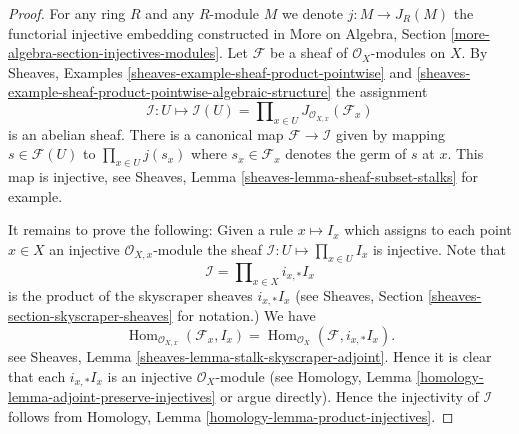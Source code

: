 \documentclass[10pt,a4paper]{amsart}
\theoremstyle{plain}
\theoremstyle{definition}
\theoremstyle{remark}
\numberwithin{equation}{subsection}
\def\Hom{\mathop{\mathrm{Hom}}\nolimits}
\begin{document}
\begin{proof}
For any ring $R$ and any $R$-module $M$ we denote
$j : M \to J_R(M)$ the functorial
injective embedding constructed in
More on Algebra, Section \ref{more-algebra-section-injectives-modules}.
Let $\mathcal{F}$ be a sheaf of $\mathcal{O}_X$-modules on $X$.
By Sheaves, Examples \ref{sheaves-example-sheaf-product-pointwise}
and \ref{sheaves-example-sheaf-product-pointwise-algebraic-structure}
the assignment
$$
\mathcal{I} : U \mapsto
\mathcal{I}(U) = \prod\nolimits_{x\in U} J_{\mathcal{O}_{X, x}}(\mathcal{F}_x)
$$
is an abelian sheaf.
There is a canonical map $\mathcal{F} \to \mathcal{I}$
given by mapping $s \in \mathcal{F}(U)$ to $\prod_{x \in U} j(s_x)$
where $s_x \in \mathcal{F}_x$ denotes the germ of $s$ at $x$.
This map is injective, see
Sheaves, Lemma \ref{sheaves-lemma-sheaf-subset-stalks}
for example.

\medskip\noindent
It remains to prove the following: Given a rule
$x \mapsto I_x$ which assigns to each point $x \in X$ an injective
$\mathcal{O}_{X, x}$-module
the sheaf $\mathcal{I} : U \mapsto \prod_{x \in U} I_x$
is injective. Note that
$$
\mathcal{I} = \prod\nolimits_{x \in X} i_{x, *}I_x
$$
is the product of the skyscraper sheaves $i_{x, *}I_x$ (see
Sheaves, Section \ref{sheaves-section-skyscraper-sheaves} for notation.)
We have
$$
\Hom_{\mathcal{O}_{X, x}}(\mathcal{F}_x, I_x)
=
\Hom_{\mathcal{O}_X}(\mathcal{F}, i_{x, *}I_x).
$$
see Sheaves, Lemma \ref{sheaves-lemma-stalk-skyscraper-adjoint}. Hence it is
clear that each $i_{x, *}I_x$ is an injective $\mathcal{O}_X$-module
(see Homology, Lemma \ref{homology-lemma-adjoint-preserve-injectives} or argue
directly). Hence the injectivity of $\mathcal{I}$ follows from
Homology, Lemma \ref{homology-lemma-product-injectives}.
\end{proof}
\end{document}
